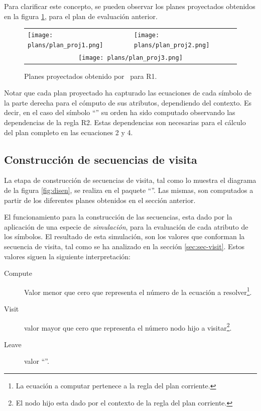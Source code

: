 Para clarificar este concepto, se pueden observar los planes proyectados obtenidos en la figura \ref{fig:plan_project}, para el plan de evaluación anterior.

\begin{figure}[!ht]\centering
\begin{tabular}{l l}
\texttt{[image: plans/plan\_proj1.png]} &
\texttt{[image: plans/plan\_proj2.png]}\\ 
\multicolumn{2}{c}{\texttt{[image: plans/plan\_proj3.png]}}\\
\end{tabular}
\caption{\label{fig:plan_project}Planes proyectados obtenido por \maggen\ para R1.}
\end{figure}

Notar que cada plan proyectado ha capturado las ecuaciones de cada símbolo de la parte derecha para el cómputo de sus atributos, dependiendo del contexto. Es decir, en el caso del símbolo ``'' su orden ha sido computado observando las dependencias de la regla R2. Estas dependencias son necesarias para el cálculo del plan completo en las ecuaciones 2 y 4. 

\subsection{Construcción de secuencias de visita}
\label{sec:constseqvisit}

La etapa de construcción de secuencias de visita, tal como lo muestra el diagrama de la figura \ref{fig:disen}, se realiza en el paquete ``''. Las mismas, son computados a partir de los diferentes planes obtenidos en el sección anterior.

El funcionamiento para la construcción de las secuencias, esta dado por la aplicación de una especie de \textit{simulación}, para la evaluación de cada atributo de los símbolos. El resultado de esta simulación, son los valores que conforman la secuencia de visita, tal como se ha analizado en la sección \ref{sec:sec-visit}. Estos valores siguen la siguiente interpretación: 

\begin{description}
\item [Compute] Valor menor que cero que representa el número de la ecuación a resolver\footnote{La ecuación a computar pertenece a la regla del plan corriente.}.
\item [Visit] valor mayor que cero que representa el número nodo hijo a visitar\footnote{El nodo hijo esta dado por el contexto de la regla del plan corriente.}.
\item [Leave] valor ``''.
\end{description}

